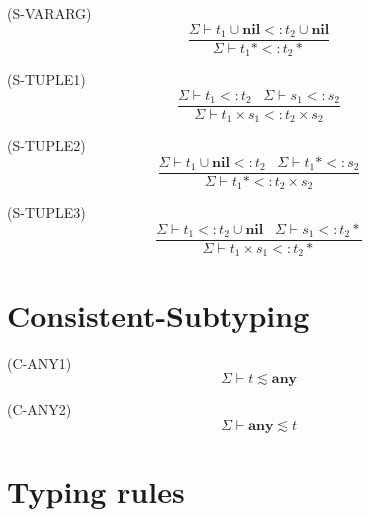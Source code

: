 \documentclass{paper}
\newcommand{\Any}{\mathbf{any}}
\newcommand{\Nil}{\mathbf{nil}}
\newcommand{\mylabel}[1]{\; (\textsc{#1})}
\newcommand{\senv}{\Sigma}
\newcommand{\subtype}{<:}
\begin{document}
\mylabel{S-VARARG}
\[
\dfrac{\senv \vdash t_{1} \cup \Nil \subtype t_{2} \cup \Nil}
      {\senv \vdash t_{1}* \subtype t_{2}*}
\]

\mylabel{S-TUPLE1}
\[
\dfrac{\senv \vdash t_{1} \subtype t_{2} \;\;\;
       \senv \vdash s_{1} \subtype s_{2}}
      {\senv \vdash t_{1} \times s_{1} \subtype t_{2} \times s_{2}}
\]

\mylabel{S-TUPLE2}
\[
\dfrac{\senv \vdash t_{1} \cup \Nil \subtype t_{2} \;\;\;
       \senv \vdash t_{1}* \subtype s_{2}}
      {\senv \vdash t_{1}* \subtype t_{2} \times s_{2}}
\]

\mylabel{S-TUPLE3}
\[
\dfrac{\senv \vdash t_{1} \subtype t_{2} \cup \Nil \;\;\;
       \senv \vdash s_{1} \subtype t_{2}*}
      {\senv \vdash t_{1} \times s_{1} \subtype t_{2}*}
\]

\section{Consistent-Subtyping}

\noindent

\mylabel{C-ANY1}
\[
\senv \vdash t \lesssim \Any
\]

\mylabel{C-ANY2}
\[
\senv \vdash \Any \lesssim t
\]

\section{Typing rules}
\end{document}
